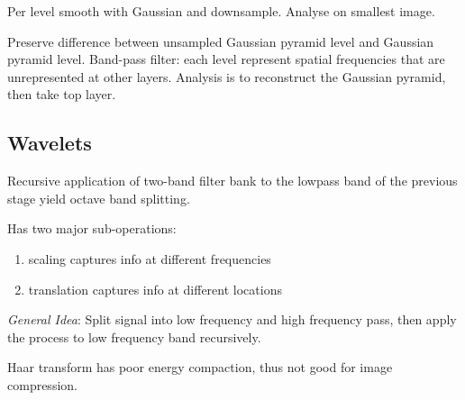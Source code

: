 \begin{definition}
  Per level smooth with Gaussian and downsample. Analyse on smallest image. 
\end{definition}

\pagebreak
\begin{definition}
  Preserve difference between unsampled Gaussian pyramid level and Gaussian pyramid level.
  Band-pass filter: each level represent spatial frequencies that are unrepresented at other layers.
  Analysis is to reconstruct the Gaussian pyramid, then take top layer.
\end{definition}

\subsection{Wavelets}

\begin{definition}
  Recursive application of two-band filter bank to the lowpass band of the previous stage yield octave band splitting.
\end{definition}

\begin{algorithm}
  Has two major sub-operations:
  \begin{enumerate}
    \item scaling captures info at different frequencies
    \item translation captures info at different locations
  \end{enumerate}

  \textit{General Idea}: Split signal into low frequency and high frequency pass, then apply the process to low frequency band recursively.
\end{algorithm}

\begin{theorem}
  Haar transform has poor energy compaction, thus not good for image compression.
\end{theorem}
